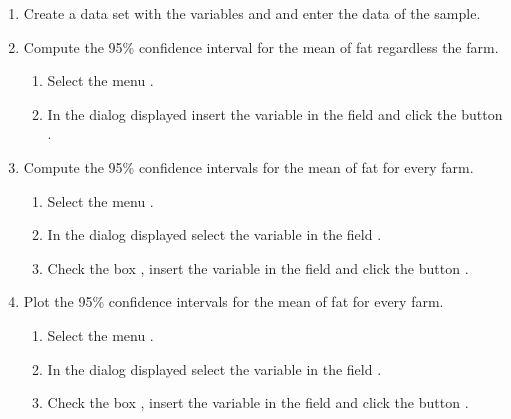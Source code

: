 \begin{enumerate}[leftmargin=*]
\begin{enumerate}
\item Create a data set with the variables  and  and enter the data of the sample.

\item Compute the 95\% confidence interval for the mean of fat regardless the farm. 
\begin{indication}
\begin{enumerate}
\item Select the menu .
\item In the dialog displayed insert the variable  in the field  and click the button
.
\end{enumerate}
\end{indication}

\item Compute the 95\% confidence intervals for the mean of fat for every farm. 
\begin{indication}
\begin{enumerate}
\item Select the menu .
\item In the dialog displayed select the variable  in the field .
\item Check the box , insert the variable  in the field  and click the button .
\end{enumerate}
\end{indication}

\item Plot the 95\% confidence intervals for the mean of fat for every farm. 
\begin{indication}
\begin{enumerate}
\item Select the menu .
\item In the dialog displayed select the variable  in the field .
\item Check the box , insert the variable  in the field  and click the button .
\end{enumerate}
\end{indication}


\end{enumerate}
\end{enumerate}

